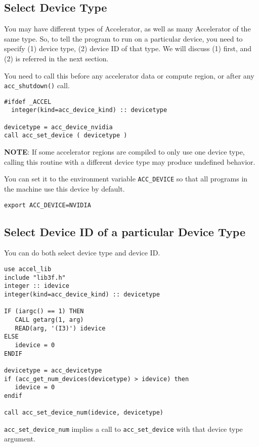 \subsection{Select Device Type}
\label{sec:select-device}

You may have different types of Accelerator, as well as many
Accelerator of the same type. So, to tell the program to run on a
particular device, you need to specify (1) device type, (2) device ID
of that type. We will discuss (1) first, and (2) is referred in the
next section.

You need to call this before any accelerator data or compute region,
or after any \verb!acc_shutdown()! call.

\begin{lstlisting}
#ifdef _ACCEL
  integer(kind=acc_device_kind) :: devicetype

devicetype = acc_device_nvidia
call acc_set_device ( devicetype )
\end{lstlisting}

{\bf NOTE}: If some accelerator regions are compiled to only use one
device type, calling this routine with a different device type may
produce undefined behavior.


You can set it to the environment variable \verb!ACC_DEVICE! so that
all programs in the machine use this device by default.
\begin{verbatim}
export ACC_DEVICE=NVIDIA
\end{verbatim}

\subsection{Select Device ID of a particular Device Type}
\label{sec:select-device-id}

You can do both select device type and device ID.

\begin{lstlisting}
use accel_lib
include "lib3f.h"
integer :: idevice
integer(kind=acc_device_kind) :: devicetype

IF (iargc() == 1) THEN
   CALL getarg(1, arg)
   READ(arg, '(I3)') idevice
ELSE
   idevice = 0
ENDIF

devicetype = acc_devicetype
if (acc_get_num_devices(devicetype) > idevice) then
   idevice = 0
endif

call acc_set_device_num(idevice, devicetype)
\end{lstlisting}
\verb!acc_set_device_num! implies a call to \verb!acc_set_device! with
that device type argument.

